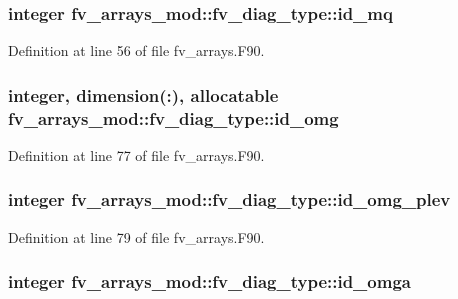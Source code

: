 \subsubsection[{id\-\_\-mq}]{\setlength{\rightskip}{0pt plus 5cm}integer fv\-\_\-arrays\-\_\-mod\-::fv\-\_\-diag\-\_\-type\-::id\-\_\-mq}\label{structfv__arrays__mod_1_1fv__diag__type_a7744a8aefae0ec2226811fcc68364317}


Definition at line 56 of file fv\-\_\-arrays.\-F90.

\subsubsection[{id\-\_\-omg}]{\setlength{\rightskip}{0pt plus 5cm}integer, dimension(\-:), allocatable fv\-\_\-arrays\-\_\-mod\-::fv\-\_\-diag\-\_\-type\-::id\-\_\-omg}\label{structfv__arrays__mod_1_1fv__diag__type_a5cbfc6d945494714b611d2efe81cf95f}


Definition at line 77 of file fv\-\_\-arrays.\-F90.

\subsubsection[{id\-\_\-omg\-\_\-plev}]{\setlength{\rightskip}{0pt plus 5cm}integer fv\-\_\-arrays\-\_\-mod\-::fv\-\_\-diag\-\_\-type\-::id\-\_\-omg\-\_\-plev}\label{structfv__arrays__mod_1_1fv__diag__type_a5e9a9f0917c7dc78d3fb933acc1b2765}


Definition at line 79 of file fv\-\_\-arrays.\-F90.

\subsubsection[{id\-\_\-omga}]{\setlength{\rightskip}{0pt plus 5cm}integer fv\-\_\-arrays\-\_\-mod\-::fv\-\_\-diag\-\_\-type\-::id\-\_\-omga}\label{structfv__arrays__mod_1_1fv__diag__type_a099c1591bd31eabe7488f23403b55111}


